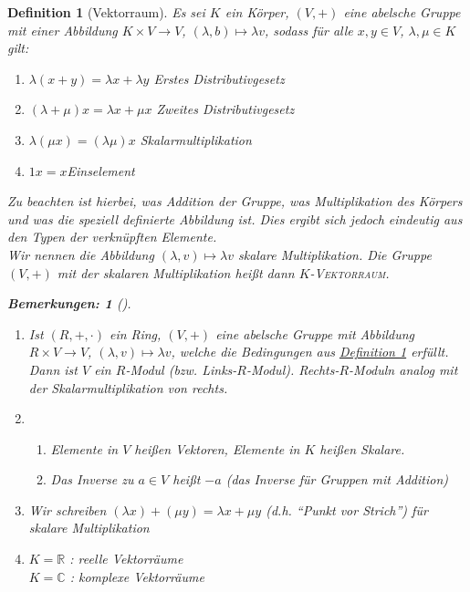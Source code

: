 \documentclass{report}
\newcommand{\IN}[1]{\index{#1|BH}}
\newcommand{\lb}{\lambda}
\newcommand{\R}{\mathbb{R}}
\newcommand{\C}{\mathbb{C}}
\theoremstyle{customrem}
\newtheorem*{bemerkung2}{Bemerkungen\textnormal:}
\newenvironment{bemerkungen}[1][]{\begin{bemerkung2}[#1]\leavevmode}{\end{bemerkung2}}
\theoremstyle{customdef}
\newtheorem{definition}{Definition}[chapter]
\theoremstyle{customenv}
\newcommand{\defemph}[1]{\textsc{#1}}
\begin{document}
	\begin{definition}[Vektorraum]
		\IN{Vektorraum}
		\label{def21}
		Es sei \(K\) ein Körper, \((V, +)\) eine abelsche Gruppe mit einer Abbildung \(K \times V \to V\), \((\lb, b) \mapsto \lb v\), sodass für alle \(x, y \in V\), \(\lb, \mu \in K\) gilt:
		
		\begin{enumerate}[leftmargin=3cm, rightmargin=2cm]
			\itemsep0cm
			\item \(\lb (x + y) = \lb x + \lb y\) \hfill Erstes Distributivgesetz
			\item \((\lb + \mu) x = \lb x + \mu x\) \hfill Zweites Distributivgesetz
			\item \(\lb (\mu x) = (\lb \mu) x\)	\hfill Skalarmultiplikation
			\item \(1 x = x\)\hfill Einselement
		\end{enumerate}
		
		
		Zu beachten ist hierbei, was Addition der Gruppe, was Multiplikation des Körpers und was die speziell definierte Abbildung ist. Dies ergibt sich jedoch eindeutig aus den Typen der verknüpften Elemente.\\
		Wir nennen die Abbildung \((\lb, v) \mapsto \lb v\) skalare Multiplikation. Die Gruppe \((V, +)\) mit der skalaren Multiplikation  heißt dann \(K\)-\defemph{Vektorraum}.
		
		\begin{bemerkungen}
			\begin{enumerate}
				\item Ist \((R, +, \cdot)\) ein Ring, \((V, +)\) eine abelsche Gruppe mit Abbildung \(R \times V \to V\), \((\lb, v) \mapsto \lb v\), welche die Bedingungen aus \hyperref[def21]{Definition \ref*{def21}} erfüllt. Dann ist \(V\) ein \(R\)-Modul (bzw. Links-\(R\)-Modul).	Rechts-\(R\)-Moduln analog mit der Skalarmultiplikation von rechts.
				\item
				\begin{enumerate}
					\item Elemente in \(V\) heißen Vektoren, Elemente in \(K\) heißen Skalare.
					\item Das Inverse zu \(a \in V\) heißt \(-a\) (das Inverse für Gruppen mit Addition)
				\end{enumerate}
				\item Wir schreiben \((\lb x) + (\mu y) = \lb x + \mu y\) (d.h. "`Punkt vor Strich"') für skalare Multiplikation
				\item
				\(K = \R\) : reelle Vektorräume\\
				\(K = \C\) : komplexe Vektorräume
			\end{enumerate}
		\end{bemerkungen}
		

\end{definition}
\end{document}
